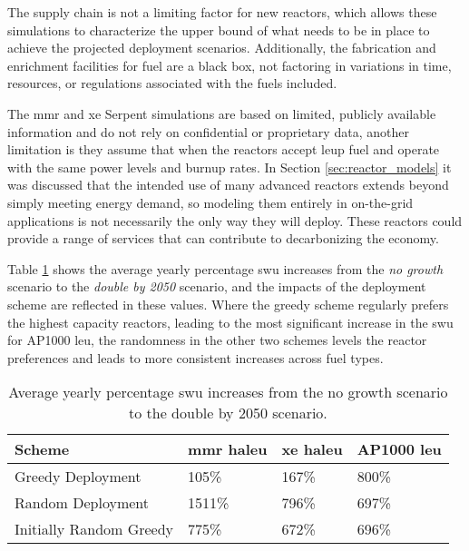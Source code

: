 The supply chain is not a limiting factor for new reactors, which allows these simulations to characterize the upper bound of what needs to be in place to achieve the projected deployment scenarios. Additionally, the fabrication and enrichment facilities for fuel are a black box, not factoring in variations in time, resources, or regulations associated with the fuels included.

The \gls{mmr} and \gls{xe} Serpent simulations are based on limited, publicly available information and do not rely on confidential or proprietary data, another limitation is they assume that when the reactors accept \gls{leup} fuel and operate with the same power levels and burnup rates. In Section \ref{sec:reactor_models} it was discussed that the intended use of many advanced reactors extends beyond simply meeting energy demand, so modeling them entirely in on-the-grid applications is not necessarily the only way they will deploy. These reactors could provide a range of services that can contribute to decarbonizing the economy.

Table \ref{tab:swu_incs} shows the average yearly percentage \gls{swu} increases from the \textit{no growth} scenario to the \textit{double by 2050} scenario, and the impacts of the deployment scheme are reflected in these values. Where the greedy scheme regularly prefers the highest capacity reactors, leading to the most significant increase in the \gls{swu} for AP1000 \gls{leu}, the randomness in the other two schemes levels the reactor preferences and leads to more consistent increases across fuel types.

\begin{table}[H]
    \centering
    \caption{Average yearly percentage \gls{swu} increases from the no growth scenario to the double by 2050 scenario.}
    \label{tab:swu_incs}
    \begin{tabular}{l l l l}
        \hline
        Scheme & \gls{mmr} \gls{haleu} & \gls{xe} \gls{haleu} & AP1000 \gls{leu}\\
        \hline
        Greedy Deployment & 105\% & 167\% & 800\% \\
        Random Deployment & 1511\% & 796\% & 697\% \\
        Initially Random Greedy & 775\% & 672\% & 696\% \\
        \hline
    \end{tabular}
\end{table}


